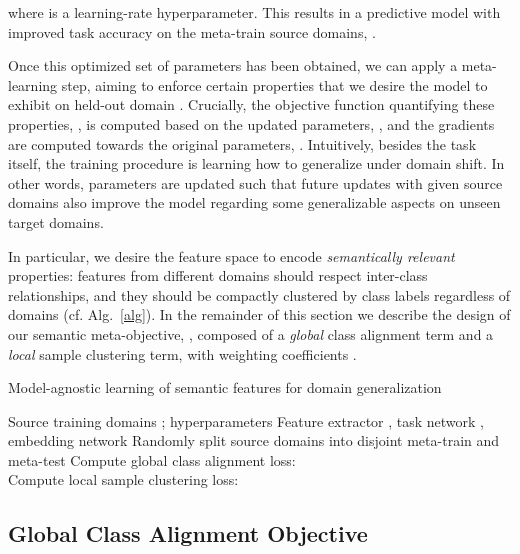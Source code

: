 \documentclass{article}
\begin{document}
where  is a learning-rate hyperparameter. This results in a predictive model  with improved task accuracy on the meta-train source domains, .

Once this optimized set of parameters has been obtained, we can apply a meta-learning step, aiming to enforce certain properties that we desire the model to exhibit on held-out domain . Crucially, the objective function quantifying these properties, , is computed based on the updated parameters, , and the gradients are computed towards the original parameters, . 
Intuitively, besides the task itself, the training procedure is learning how to generalize under domain shift.
In other words, parameters are updated such that future updates with given source domains also improve the model regarding some generalizable aspects on unseen target domains.

In particular, we desire the feature space to encode \emph{semantically relevant} properties: features from different domains should respect inter-class relationships, and they should be compactly clustered by class labels regardless of domains (cf. Alg.~\ref{alg}). In the remainder of this section we describe the design of our semantic meta-objective, , composed of a \emph{global} class alignment term and a \emph{local} sample clustering term, with weighting coefficients .



\begin{algorithm}[t]
\caption{Model-agnostic learning of semantic features for domain generalization}
\begin{algorithmic}[1]
    \REQUIRE Source training domains ; hyperparameters 
    \ENSURE Feature extractor , task network , embedding network 
    \REPEAT
        \STATE Randomly split source domains  into disjoint meta-train  and meta-test 
        \STATE 
\STATE Compute global class alignment loss: \\
         
\STATE Compute local sample clustering loss: \\
            
        \STATE 
        \STATE 
        \STATE 
\end{algorithmic}
\label{alg}
\end{algorithm}


\subsection{Global Class Alignment Objective}\label{sec:global_loss}
\end{document}
